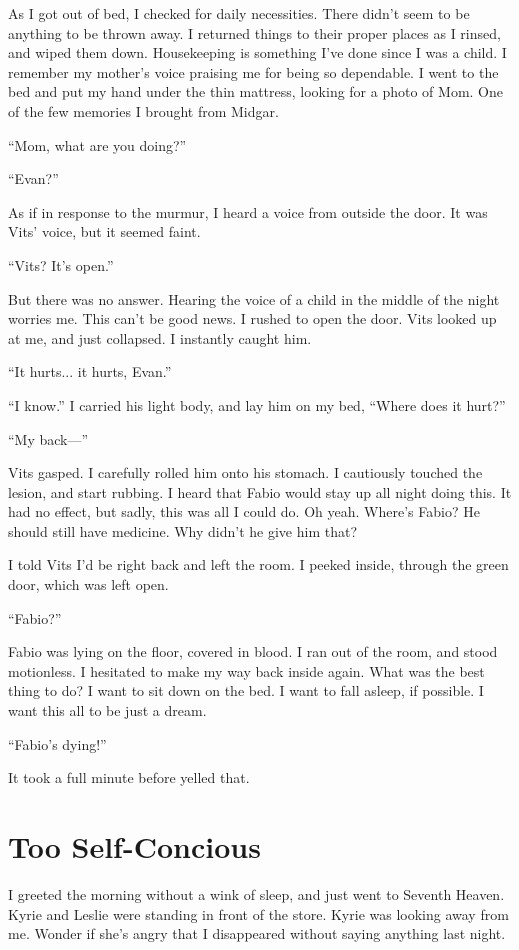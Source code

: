 \documentclass[oneside]{book}
\begin{document}
As I got out of bed, I checked for daily necessities. There didn’t seem to be anything to be thrown away. I returned things to their proper places as I rinsed, and wiped them down. Housekeeping is something I’ve done since I was a child. I remember my mother’s voice praising me for being so dependable. I went to the bed and put my hand under the thin mattress, looking for a photo of Mom. One of the few memories I brought from Midgar.

“Mom, what are you doing?”

“Evan?”

As if in response to the murmur, I heard a voice from outside the door. It was Vits’ voice, but it seemed faint.

“Vits? It’s open.”

But there was no answer. Hearing the voice of a child in the middle of the night worries me. This can’t be good news. I rushed to open the door. Vits looked up at me, and just collapsed. I instantly caught him.

“It hurts... it hurts, Evan.”

“I know.” I carried his light body, and lay him on my bed, “Where does it hurt?”

“My back—”

Vits gasped. I carefully rolled him onto his stomach. I cautiously touched the lesion, and start rubbing. I heard that Fabio would stay up all night doing this. It had no effect, but sadly, this was all I could do. Oh yeah. Where’s Fabio? He should still have medicine. Why didn’t he give him that?

I told Vits I’d be right back and left the room. I peeked inside, through the green door, which was left open.

“Fabio?”

Fabio was lying on the floor, covered in blood. I ran out of the room, and stood motionless. I hesitated to make my way back inside again. What was the best thing to do? I want to sit down on the bed. I want to fall asleep, if possible. I want this all to be just a dream.

“Fabio’s dying!”

It took a full minute before yelled that.

\chapter{Too Self-Concious}
I greeted the morning without a wink of sleep, and just went to Seventh Heaven. Kyrie and Leslie were standing in front of the store. Kyrie was looking away from me. Wonder if she’s angry that I disappeared without saying anything last night.
\end{document}
